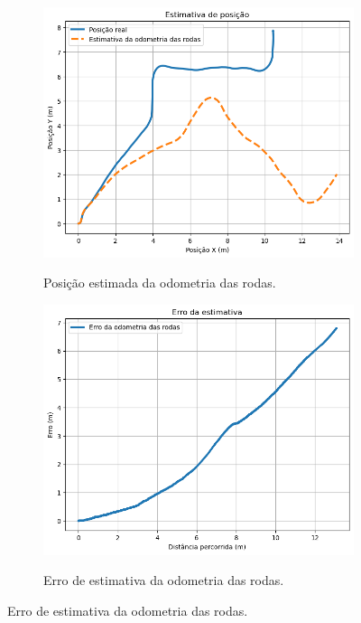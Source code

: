 \documentclass[repeatfields,xlists,xpacks,oneside,yearsonly]{ufrgscca}
\begin{document}
\begin{figure}[H]
    \caption{Resultado da odometria das rodas.}
    \label{fig:controller_odom_result}
    \begin{subfigure}{0.5\linewidth}
        {
            \centering
            \caption{Posição estimada da odometria das rodas.}
            \label{fig:odom_controller}
            \includegraphics[width=0.98\linewidth]{odom-controlador-new.png}\\
        }
    \end{subfigure}
    \begin{subfigure}{0.5\linewidth}
        {
            \centering
            \caption{Erro de estimativa da odometria das rodas.}
            \label{fig:odom_controller_error}
            \includegraphics[width=0.98\linewidth]{odom-controlador-error-new.png}\\
        }
    \end{subfigure}
\end{figure}
\end{document}
